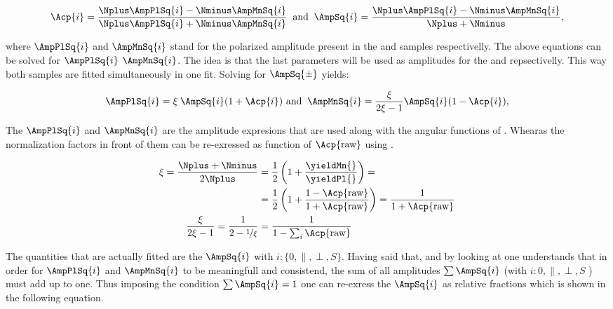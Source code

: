 \begin{equation}
\Acp{i} = \frac{\Nplus\AmpPlSq{i} - \Nminus\AmpMnSq{i}}{\Nplus\AmpPlSq{i} + \Nminus\AmpMnSq{i} }\;\; \text{and} \;\;
\AmpSq{i} = \frac{ \Nplus \AmpPlSq{i} - \Nminus\AmpMnSq{i}}{\Nplus + \Nminus},
\label{acp_param}
\end{equation}

\noindent where $\AmpPlSq{i}$ and $\AmpMnSq{i}$ stand for the polarized amplitude present in the \BsbarJpsiKst
and \BsJpsiKst samples respectivelly. The above equations can be solved for $\AmpPlSq{i}$  $\AmpMnSq{i}$. The idea
is that the last parameters will be used as amplitudes for the \BsbarJpsiKst and \BsJpsiKst \pdfs repsectivelly.
This way both samples are fitted simultaneously in one fit. Solving  for $\AmpSq{\pm}$ yields: 

\begin{equation}
\AmpPlSq{i} = \xi \; \AmpSq{i} (1+\Acp{i}) \,\, \text{and}\;\; \AmpMnSq{i} = \frac{\xi}{2\xi-1} \AmpSq{i} (1-\Acp{i}),
\label{acp_free}
\end{equation}

\noindent The $\AmpPlSq{i}$ and $\AmpMnSq{i}$ are the amplitude expresions that are used along with the angular functions of .
Whearas the normalization factors in front of them can be re-exressed as function of $\Acp{\text{raw}}$ using .

\begin{align}
\xi = \frac{\Nplus+\Nminus}{2\Nplus} &= \frac{1}{2}\left( 1 + \frac{\yieldMn{}}{\yieldPl{}}\right) = \nonumber \\ 
                                     &= \frac{1}{2}\left( 1 + \frac{1-\Acp{\text{raw}}}{1+\Acp{\text{raw}}}\right) =
                                        \frac{1}{1+\Acp{\text{raw}}}  \\
\frac{\xi}{2\xi-1} = \frac{1}{2-\nicefrac{1}{\xi}} &= \frac{1}{1-\sum_i\Acp{\text{raw}}}
\label{amp_norms}
\end{align}

The quantities that are actually fitted are the $\AmpSq{i}$ with $i:\{0,\parallel,\perp,S\}$. Having said that, and by looking at 
one understands that in order for $\AmpPlSq{i}$ and $\AmpMnSq{i}$ to be meaningfull and consistend, the sum of all amplitudes $\sum\AmpSq{i}$ 
(with $i:{0,\parallel,\perp,S}$ ) must add up to one. Thus imposing the condition $\sum\AmpSq{i} = 1$ one can re-exress the $\AmpSq{i}$
as relative fractions which is shown in the following equation.

